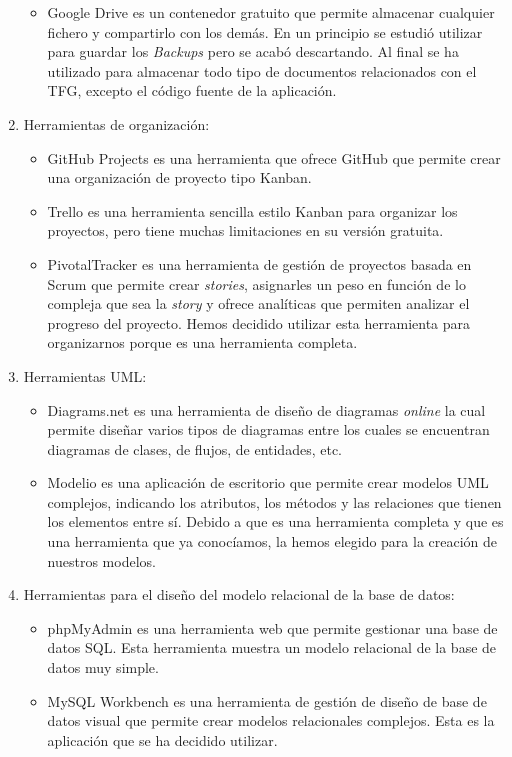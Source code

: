 \documentclass[11pt]{book}
\begin{document}
\begin{enumerate}
\begin{itemize}
			\item Google Drive es un contenedor gratuito que permite almacenar cualquier fichero y compartirlo con los demás. En un principio se estudió utilizar para guardar los \textit{Backups} pero se acabó descartando. Al final se ha utilizado para almacenar todo tipo de documentos relacionados con el TFG, excepto el código fuente de la aplicación.
		\end{itemize}
		\item Herramientas de organización: 
		\begin{itemize} 
			\item GitHub Projects es una herramienta que ofrece GitHub que permite crear una organización de proyecto tipo Kanban.
			\item Trello es una herramienta sencilla estilo Kanban para organizar los proyectos, pero tiene muchas limitaciones en su versión gratuita.
			\item PivotalTracker es una herramienta de gestión de proyectos basada en Scrum que permite crear \textit{stories}, asignarles un peso en función de lo compleja que sea la \textit{story} y ofrece analíticas que permiten analizar el progreso del proyecto. Hemos decidido utilizar esta herramienta para organizarnos porque es una herramienta completa.
		\end{itemize}
		\item Herramientas UML: 
		\begin{itemize} 
			\item Diagrams.net es una herramienta de diseño de diagramas \textit{online} la cual permite diseñar varios tipos de diagramas entre los cuales se encuentran diagramas de clases, de flujos, de entidades, etc.
			\item Modelio es una aplicación de escritorio que permite crear modelos UML complejos, indicando los atributos, los métodos y las relaciones que tienen los elementos entre sí. Debido a que es una herramienta completa y que es una herramienta que ya conocíamos, la hemos elegido para la creación de nuestros modelos.
		\end{itemize}
		\item Herramientas para el diseño del modelo relacional de la base de datos: 
		\begin{itemize} 
			\item phpMyAdmin es una herramienta web que permite gestionar una base de datos SQL. Esta herramienta muestra un modelo relacional de la base de datos muy simple.
			\item MySQL Workbench es una herramienta de gestión de diseño de base de datos visual que permite crear modelos relacionales complejos. Esta es la aplicación que se ha decidido utilizar.

\end{itemize}
\end{enumerate}
\end{document}
